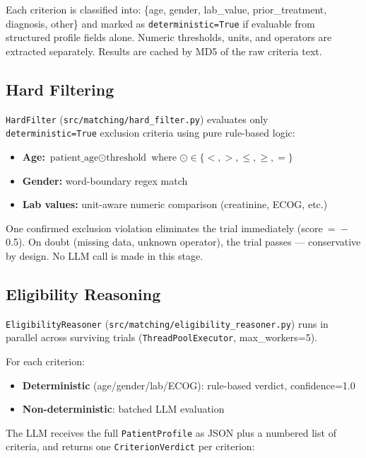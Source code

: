 \documentclass[10pt,twocolumn]{article}
\begin{document}
Each criterion is classified into: \{age, gender, lab\_value, prior\_treatment,
diagnosis, other\} and marked as \texttt{deterministic=True} if evaluable from
structured profile fields alone. Numeric thresholds, units, and operators are
extracted separately. Results are cached by MD5 of the raw criteria text.

\subsection{Hard Filtering}

\texttt{HardFilter} (\texttt{src/matching/hard\_filter.py}) evaluates only
\texttt{deterministic=True} exclusion criteria using pure rule-based logic:

\begin{itemize}[leftmargin=*, noitemsep, topsep=2pt]
  \item \textbf{Age:} $\text{patient\_age} \odot \text{threshold}$ where $\odot \in \{<,>,\le,\ge,=\}$
  \item \textbf{Gender:} word-boundary regex match
  \item \textbf{Lab values:} unit-aware numeric comparison (creatinine, ECOG, etc.)
\end{itemize}

One confirmed exclusion violation eliminates the trial immediately (score~=~$-$0.5).
On doubt (missing data, unknown operator), the trial passes — conservative by design.
No LLM call is made in this stage.

\subsection{Eligibility Reasoning}

\texttt{EligibilityReasoner} (\texttt{src/matching/eligibility\_reasoner.py})
runs in parallel across surviving trials (\texttt{ThreadPoolExecutor}, max\_workers=5).

For each criterion:
\begin{itemize}[leftmargin=*, noitemsep, topsep=2pt]
  \item \textbf{Deterministic} (age/gender/lab/ECOG): rule-based verdict, confidence=1.0
  \item \textbf{Non-deterministic}: batched LLM evaluation
\end{itemize}

The LLM receives the full \texttt{PatientProfile} as JSON plus a numbered list of
criteria, and returns one \texttt{CriterionVerdict} per criterion:
\end{document}
